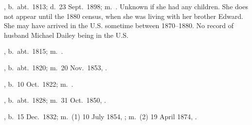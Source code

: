 \begin{Kids}
	, b.\ abt.\ 1813\cite{1880CensusAnn}; d.\ 23 Sept.\ 1898; m.\ .\cite{Ann2OBrienDeath} Unknown if she had any children. She does not appear until the 1880 census, when she was living with her brother Edward. She may have arrived in the U.S. sometime between 1870--1880. No record of husband Michael Dailey being in the U.S.
	
	, b.\ abt.\ 1815; m.\ .
	
	, b.\ abt.\ 1820; m.\ 20 Nov.\ 1853, .
	
	, b.\ 10 Oct.\ 1822; m.\ .
		
	, b.\ abt.\ 1828; m.\ 31 Oct.\ 1850, .
	
	, b.\ 15 Dec.\ 1832; m.\ (1) 10 July 1854, ; m.\ (2) 19 April 1874, .
			
\end{Kids}
